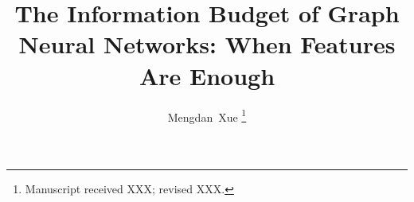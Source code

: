 \documentclass[10pt,journal,compsoc]{IEEEtran}
\title{The Information Budget of Graph Neural Networks: When Features Are Enough}
\author{Mengdan~Xue
\IEEEcompsocitemizethanks{\IEEEcompsocthanksitem M. Xue is with the Faculty of Computational Mathematics and Cybernetics, Lomonosov Moscow State University, Moscow, Russia.\protect\\
E-mail: 17326961775@163.com}
\thanks{Manuscript received XXX; revised XXX.}}
\begin{document}
\maketitle

\IEEEdisplaynontitleabstractindextext

\IEEEpeerreviewmaketitle














\end{document}
